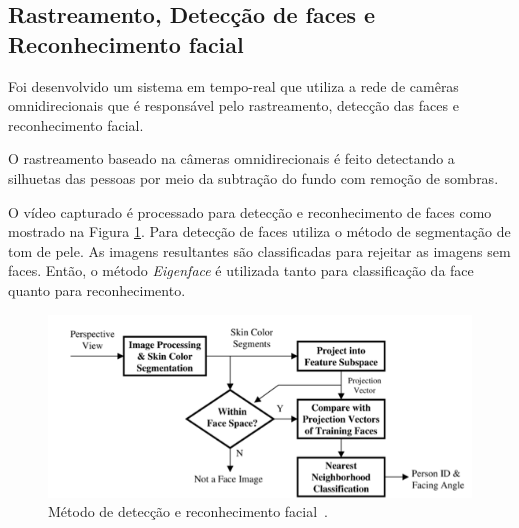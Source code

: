 \subsection{Rastreamento, Detecção de faces e Reconhecimento facial}
 
Foi desenvolvido um sistema em tempo-real que utiliza a rede de camêras omnidirecionais que é responsável pelo rastreamento, detecção das faces e reconhecimento facial. 

O rastreamento baseado na câmeras omnidirecionais é feito detectando a silhuetas das pessoas por meio da subtração do fundo com remoção de sombras.

O vídeo capturado é processado para detecção e reconhecimento de faces como mostrado na Figura \ref{facerec}. Para detecção de faces utiliza o método de segmentação de tom de pele. As imagens resultantes são classificadas para rejeitar as imagens sem faces. Então, o método \textit{Eigenface} é utilizada tanto para classificação da face quanto para reconhecimento. 

	\begin{figure}[hbt]
		\begin{center}
			\includegraphics[scale=0.8]{figuras/3.TrabalhosCorrelatos/facerec.png}
		\end{center}
		\caption{Método de detecção e reconhecimento facial~\cite{trivedi}.}
		\label{facerec}
	\end{figure}














































